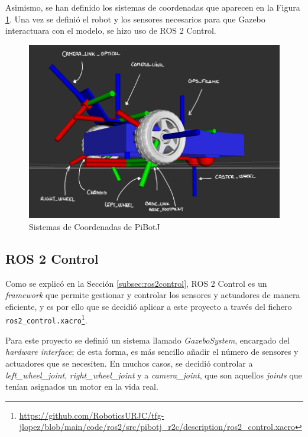 Asimismo, se han definido los sistemas de coordenadas que aparecen en la Figura \ref{fig:links}. Una vez se definió el robot y los sensores necesarios para que Gazebo interactuara con el modelo, se hizo uso de ROS 2 Control. 

\begin{figure} [h!]
	\begin{center}
		\includegraphics[width=13cm]{figs/cap6/links.png}
	\end{center}
	\caption{Sistemas de Coordenadas de PiBotJ}
	\label{fig:links}
\end{figure}


\subsection{ROS 2 Control}
\label{subsec:cap6ros2control}

Como se explicó en la Sección \ref{subsec:ros2control}, ROS 2 Control es un \textit{framework} que permite gestionar y controlar los sensores y actuadores de manera eficiente, y es por ello que se decidió aplicar a este proyecto a través del fichero \verb|ros2_control.xacro|\footnote{\url{https://github.com/RoboticsURJC/tfg-jlopez/blob/main/code/ros2/src/pibotj_r2c/description/ros2_control.xacro}}.

Para este proyecto se definió un sistema llamado \textit{GazeboSystem}, encargado del \textit{hardware interface}; de esta forma, es más sencillo añadir el número de sensores y actuadores que se necesiten. En muchos casos, se decidió controlar a \textit{left\_wheel\_joint}, \textit{right\_wheel\_joint} y a \textit{camera\_joint}, que son aquellos \textit{joints} que tenían asignados un motor en la vida real. 

